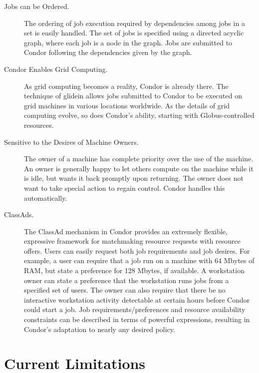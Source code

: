 \begin{description}
	\item[Jobs can be Ordered.] The ordering of job execution
required by dependencies among jobs in a set is easily handled.
The set of jobs is specified using a directed acyclic graph,
where each job is a node in the graph.
Jobs are submitted to Condor following the dependencies given
by the graph.
	\item[Condor Enables Grid Computing.] As grid computing
becomes a reality, Condor is already there.
The technique of glidein allows jobs submitted to Condor
to be executed on grid machines in various locations worldwide.
As the details of grid computing evolve, so does Condor's
ability, starting with Globus-controlled resources.
	\item[Sensitive to the Desires of Machine Owners.] The
owner of a machine has complete priority over the use
of the machine.
An owner is generally happy to let others compute on
the machine while it is idle, but wants it back
promptly upon returning. The owner does not want to take special
action to regain control. Condor handles this automatically. 
	\item[ClassAds.]The ClassAd mechanism 
in Condor provides an extremely
flexible, expressive framework for matchmaking
resource requests with resource offers.
Users can easily request both job requirements and job desires.
For example, a user can require that a job run on a machine
with 64 Mbytes of RAM,
but state a preference for 128 Mbytes, if available.
A workstation owner
can state a preference that the workstation runs jobs
from a specified set of users. 
The owner can also require that there be no interactive workstation
activity detectable at certain hours before Condor could
start a job.
Job requirements/preferences and resource availability constraints can be
described in terms of powerful expressions, resulting in
Condor's adaptation to nearly any desired policy. 
\end{description}

\section{\label{sec:current-limitations}Current Limitations}

